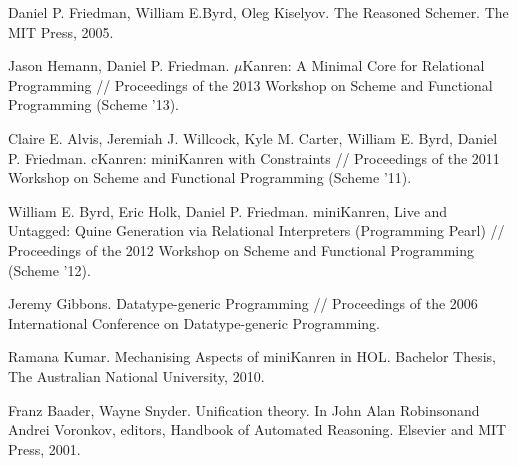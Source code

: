 \documentclass{llncs}
\begin{document}
\begin{thebibliography}{99}
Daniel P. Friedman, William E.Byrd, Oleg Kiselyov. The Reasoned Schemer. The MIT
Press, 2005.

Jason Hemann, Daniel P. Friedman. $\mu$Kanren: A Minimal Core for Relational Programming //
Proceedings of the 2013 Workshop on Scheme and Functional Programming (Scheme '13).

Claire E. Alvis, Jeremiah J. Willcock, Kyle M. Carter, William E. Byrd, Daniel P. Friedman.
cKanren: miniKanren with Constraints //
Proceedings of the 2011 Workshop on Scheme and Functional Programming (Scheme '11).

William E. Byrd, Eric Holk, Daniel P. Friedman.
miniKanren, Live and Untagged: Quine Generation via Relational Interpreters (Programming Pearl) //
Proceedings of the 2012 Workshop on Scheme and Functional Programming (Scheme '12).




Jeremy Gibbons. Datatype-generic Programming //
Proceedings of the 2006 International Conference on Datatype-generic Programming.




Ramana Kumar. Mechanising Aspects of miniKanren in HOL. Bachelor Thesis, The Australian National University, 2010.

Franz Baader, Wayne Snyder. Uniﬁcation theory. In John Alan Robinsonand Andrei Voronkov, editors,
Handbook of Automated Reasoning. Elsevier and MIT Press, 2001.


\end{thebibliography}
\end{document}
